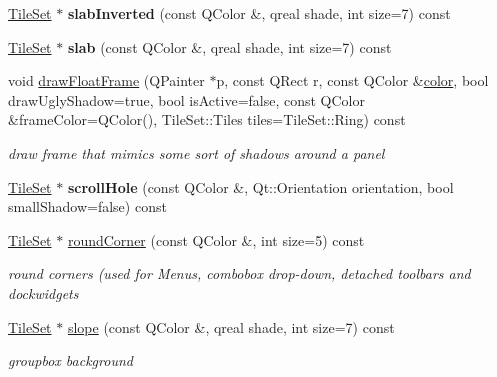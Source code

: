 \begin{Indent}
\begin{DoxyCompactItemize}
\hyperlink{class_tile_set}{Tile\+Set} $\ast$ {\bfseries slab\+Inverted} (const Q\+Color \&, qreal shade, int size=7) const
\item 
\mbox{\label{class_style_helper_a9dd4a853fa2b6d4b60203a3cda009a7b}} 
\hyperlink{class_tile_set}{Tile\+Set} $\ast$ {\bfseries slab} (const Q\+Color \&, qreal shade, int size=7) const
\item 
void \hyperlink{class_style_helper_a04574a2abfcca78015d76c4dfe10ef35}{draw\+Float\+Frame} (Q\+Painter $\ast$p, const Q\+Rect r, const Q\+Color \&\hyperlink{structcolor}{color}, bool draw\+Ugly\+Shadow=true, bool is\+Active=false, const Q\+Color \&frame\+Color=Q\+Color(), Tile\+Set\+::\+Tiles tiles=Tile\+Set\+::\+Ring) const
\begin{DoxyCompactList}\small\item\em draw frame that mimics some sort of shadows around a panel \end{DoxyCompactList}\item 
\mbox{\label{class_style_helper_aba954c15a3eaee89fad2308f71bd0f5e}} 
\hyperlink{class_tile_set}{Tile\+Set} $\ast$ {\bfseries scroll\+Hole} (const Q\+Color \&, Qt\+::\+Orientation orientation, bool small\+Shadow=false) const
\item 
\mbox{\label{class_style_helper_a06b0a7cf77fc08d5bf00313038e5798e}} 
\hyperlink{class_tile_set}{Tile\+Set} $\ast$ \hyperlink{class_style_helper_a06b0a7cf77fc08d5bf00313038e5798e}{round\+Corner} (const Q\+Color \&, int size=5) const
\begin{DoxyCompactList}\small\item\em round corners (used for Menus, combobox drop-\/down, detached toolbars and dockwidgets \end{DoxyCompactList}\item 
\mbox{\label{class_style_helper_a0f34bce1c37f5d06198a4cd107894b93}} 
\hyperlink{class_tile_set}{Tile\+Set} $\ast$ \hyperlink{class_style_helper_a0f34bce1c37f5d06198a4cd107894b93}{slope} (const Q\+Color \&, qreal shade, int size=7) const
\begin{DoxyCompactList}\small\item\em groupbox background \end{DoxyCompactList}\item 
\mbox{\label{class_style_helper_a9d2db77ab35179d9e932fc974413430f}} 

\end{DoxyCompactItemize}
\end{Indent}
